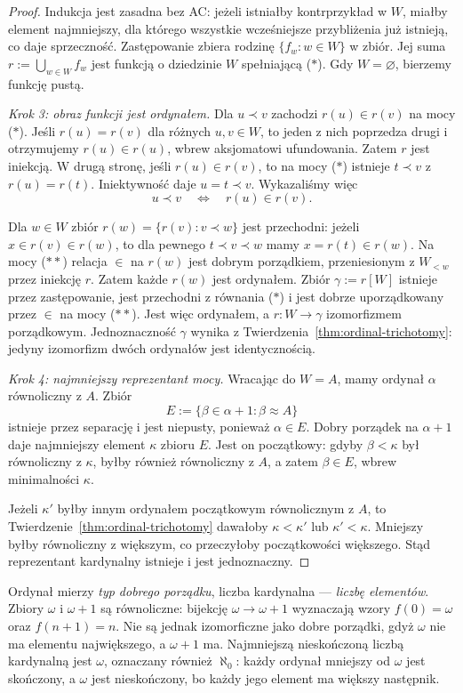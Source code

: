 \begin{proof}
Indukcja jest zasadna bez AC:
jeżeli istniałby kontrprzykład w $W$,
miałby element najmniejszy, dla którego
wszystkie wcześniejsze przybliżenia
już istnieją, co daje sprzeczność.
Zastępowanie zbiera rodzinę
$\{f_w:w\in W\}$ w zbiór.
Jej suma $r:=\bigcup_{w\in W}f_w$
jest funkcją o dziedzinie $W$
spełniającą ($*$).
Gdy $W=\varnothing$, bierzemy funkcję pustą.

\emph{Krok 3: obraz funkcji jest ordynałem.}
Dla $u\prec v$ zachodzi $r(u)\in r(v)$
na mocy ($*$). Jeśli $r(u)=r(v)$
dla różnych $u,v\in W$, to jeden
z nich poprzedza drugi i otrzymujemy
$r(u)\in r(u)$, wbrew aksjomatowi ufundowania.
Zatem $r$ jest iniekcją.
W drugą stronę, jeśli $r(u)\in r(v)$,
to na mocy ($*$) istnieje $t\prec v$
z $r(u)=r(t)$. Iniektywność daje
$u=t\prec v$.
Wykazaliśmy więc
\[
u\prec v\quad\Longleftrightarrow\quad
r(u)\in r(v).
\tag{$**$}
\]

Dla $w\in W$ zbiór
$r(w)=\{r(v):v\prec w\}$ jest przechodni:
jeżeli $x\in r(v)\in r(w)$,
to dla pewnego $t\prec v\prec w$
mamy $x=r(t)\in r(w)$.
Na mocy ($**$) relacja $\in$
na $r(w)$ jest dobrym porządkiem,
przeniesionym z $W_{<w}$ przez iniekcję $r$.
Zatem każde $r(w)$ jest ordynałem.
Zbiór $\gamma:=r[W]$ istnieje
przez zastępowanie, jest przechodni
z równania ($*$) i jest dobrze
uporządkowany przez $\in$
na mocy ($**$).
Jest więc ordynałem, a
$r:W\to\gamma$ izomorfizmem
porządkowym.
Jednoznaczność $\gamma$ wynika
z Twierdzenia~\ref{thm:ordinal-trichotomy}:
jedyny izomorfizm dwóch ordynałów
jest identycznością.

\emph{Krok 4: najmniejszy reprezentant mocy.}
Wracając do $W=A$, mamy ordynał
$\alpha$ równoliczny z $A$.
Zbiór
\[
E:=\{\beta\in\alpha+1:\beta\approx A\}
\]
istnieje przez separację i jest niepusty,
ponieważ $\alpha\in E$.
Dobry porządek na $\alpha+1$
daje najmniejszy element $\kappa$ zbioru $E$.
Jest on początkowy: gdyby
$\beta<\kappa$ był równoliczny z $\kappa$,
byłby również równoliczny z $A$,
a zatem $\beta\in E$, wbrew
minimalności $\kappa$.

Jeżeli $\kappa'$ byłby innym ordynałem
początkowym równolicznym z $A$,
to Twierdzenie~\ref{thm:ordinal-trichotomy}
dawałoby $\kappa<\kappa'$ lub $\kappa'<\kappa$.
Mniejszy byłby równoliczny z większym,
co przeczyłoby początkowości większego.
Stąd reprezentant kardynalny
istnieje i jest jednoznaczny.
\end{proof}
\begin{uwaga}
Ordynał mierzy \emph{typ dobrego porządku}, liczba kardynalna — \emph{liczbę elementów}. Zbiory $\omega$ i $\omega+1$ są równoliczne:
bijekcję $\omega\to\omega+1$ wyznaczają
wzory $f(0)=\omega$ oraz $f(n+1)=n$.
Nie są jednak izomorficzne jako dobre porządki,
gdyż $\omega$ nie ma elementu największego,
a $\omega+1$ ma.
Najmniejszą nieskończoną liczbą kardynalną
jest $\omega$, oznaczany również $\aleph_0$:
każdy ordynał mniejszy od $\omega$
jest skończony, a $\omega$ jest nieskończony,
bo każdy jego element ma większy następnik.
\end{uwaga}

